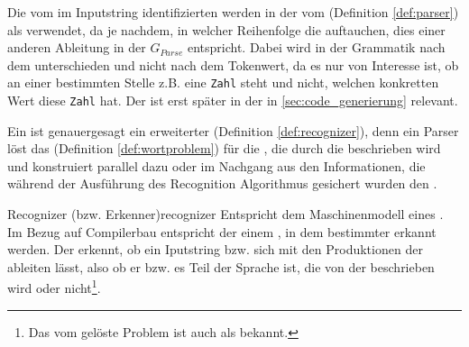 Die vom  im Inputstring identifizierten  werden in der  vom  (Definition \ref{def:parser}) als  verwendet, da je nachdem, in welcher Reihenfolge die  auftauchen, dies einer anderen Ableitung in der  $G_{Parse}$ entspricht. Dabei wird in der Grammatik nach dem  unterschieden und nicht nach dem Tokenwert, da es nur von Interesse ist, ob an einer bestimmten Stelle z.B. eine \verb|Zahl| steht und nicht, welchen konkretten Wert diese \verb|Zahl| hat. Der  ist erst später in der  in \ref{sec:code_generierung} relevant.

Ein  ist genauergesagt ein erweiterter  (Definition \ref{def:recognizer}), denn ein Parser löst das  (Definition \ref{def:wortproblem}) für die , die durch die  beschrieben wird und konstruiert parallel dazu oder im Nachgang aus den Informationen, die während der Ausführung des Recognition Algorithmus gesichert wurden den .

\begin{Definition}{Recognizer (bzw. Erkenner)}{recognizer}
  Entspricht dem Maschinenmodell eines . Im Bezug auf Compilerbau entspricht der  einem , in dem  bestimmter  erkannt werden. Der  erkennt, ob ein Iputstring bzw.  sich mit den Produktionen der  ableiten lässt, also ob er bzw. es Teil der Sprache ist, die von der  beschrieben wird oder nicht\footnote{Das vom  gelöste Problem ist auch als  bekannt.}.
\end{Definition}

